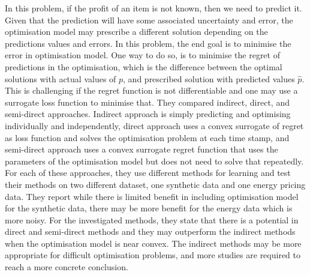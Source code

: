 \documentclass[graybox]{svmult}
\begin{document}
In this problem, if the profit of an item is not known, then we need to predict it. Given that the prediction will have some associated uncertainty and error, the optimisation model may prescribe a different solution depending on the predictions values and errors. In this problem, the end goal is to minimise the error in optimisation model. One way to do so, is to minimise the regret of predictions in the optimisation, which is the difference between the optimal solutions with actual values of $p$, and prescribed solution with predicted values $\hat{p}$. This is challenging if the regret function is not differentiable and one may use a surrogate loss function to minimise that. They compared indirect, direct, and semi-direct approaches. Indirect approach is simply predicting and optimising individually and independently, direct approach uses a convex surrogate of regret as loss function and solves the optimisation problem at each time stamp, and semi-direct approach uses a convex surrogate regret function that uses the parameters of the optimisation model but does not need to solve that repeatedly. For each of these approaches, they use different methods for learning and test their methods on two different dataset, one synthetic data and one energy pricing data. They report while there is limited benefit in including optimisation model for the synthetic data, there may be more benefit for the energy data which is more noisy. For the investigated methods, they state that there is a potential in direct and semi-direct methods and they may outperform the indirect methods when the optimisation model is near convex. The indirect methods may be more appropriate for difficult optimisation problems, and more studies are required to reach a more concrete conclusion. 
 
\end{document}
